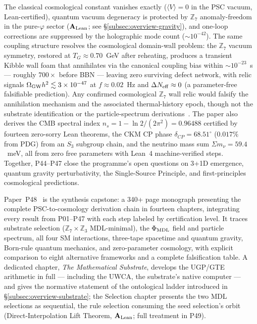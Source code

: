 The classical cosmological constant vanishes exactly ($\langle V \rangle = 0$ in
the PSC vacuum, Lean-certified), quantum vacuum degeneracy is protected by
$\mathbb{Z}_7$ anomaly-freedom in the pure-$\varphi$ sector
($\mathbf{A}_{\rm Lean}$; see \S\ref{subsec:overview-gravity}),
and one-loop corrections are suppressed by the holographic mode count ($\sim 10^{-42}$).
The same coupling structure resolves the cosmological domain-wall problem: the
$\mathbb{Z}_7$ vacuum symmetry, restored at $T_G \approx 0.70$~GeV after reheating,
produces a transient Kibble wall foam that annihilates via the canonical coupling
bias within ${\sim}10^{-23}$~s --- roughly $700\times$ before BBN --- leaving zero
surviving defect network, with relic signals $\Omega_{\rm GW}h^2 \lesssim
3\times10^{-47}$ at $f \approx 0.02$~Hz and $\Delta N_{\rm eff} \approx 0$
(a parameter-free falsifiable prediction).  Any confirmed cosmological
$\mathbb{Z}_7$ wall relic would falsify the annihilation mechanism and the
associated thermal-history epoch, though not the substrate identification or the
particle-spectrum derivations~\cite{SpivackGTECosmology}.
The paper also derives the CMB spectral index $n_s =
1 - \ln 2/(2\pi^2) = 0.96488$ certified by fourteen zero-sorry Lean theorems,
the CKM CP phase $\delta_{CP} = 68.51^\circ$ ($0.017\%$ from PDG) from an $S_3$
subgroup chain, and the neutrino mass sum $\Sigma m_\nu = 59.4$~meV, all from
zero free parameters with Lean~4 machine-verified steps.
Together, P44--P47 close the programme's open questions on 3+1D emergence, quantum
gravity perturbativity, the Single-Source Principle, and first-principles cosmological
predictions.

Paper~P48~\cite{SpivackGTECompleteFramework} is the synthesis capstone: a 340+ page
monograph presenting the complete PSC-to-cosmology derivation chain in fourteen chapters,
integrating every result from P01--P47 with each step labeled by certification level.
It traces substrate selection ($\mathbb{Z}_7 \times \mathbb{Z}_3$ MDL-minimal),
the $\Phi_{\rm MDL}$ field and particle spectrum, all four SM interactions,
three-tape spacetime and quantum gravity, Born-rule quantum mechanics, and
zero-parameter cosmology, with explicit comparison to eight alternative frameworks
and a complete falsification table.  A dedicated chapter, \emph{The Mathematical
Substrate}, develops the UGP/GTE arithmetic in full --- including the UWCA, the
substrate's native computer --- and gives the normative statement of the
ontological ladder introduced in \S\ref{subsec:overview-substrate}; the Selection
chapter presents the two MDL selections as sequential, the rule selection
consuming the seed selection's orbit
(Direct-Interpolation Lift Theorem, $\textbf{A}_{\rm Lean}$; full treatment in P49).

